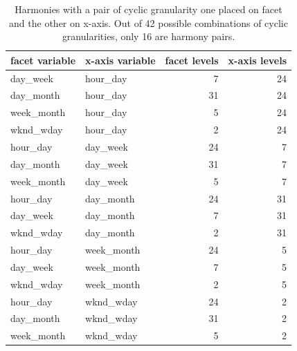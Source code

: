 \documentclass[12pt]{article}
\begin{document}
\begin{table}

\caption{\label{tab:harmony-tab}Harmonies with a pair of cyclic granularity one placed on facet and the other on x-axis. Out of 42 possible combinations of cyclic granularities, only 16 are harmony pairs.}
\centering
\begin{tabular}[t]{llrr}
\toprule
facet variable & x-axis variable & facet levels & x-axis levels\\
\midrule
day\_week & hour\_day & 7 & 24\\
day\_month & hour\_day & 31 & 24\\
week\_month & hour\_day & 5 & 24\\
wknd\_wday & hour\_day & 2 & 24\\
hour\_day & day\_week & 24 & 7\\
\addlinespace
day\_month & day\_week & 31 & 7\\
week\_month & day\_week & 5 & 7\\
hour\_day & day\_month & 24 & 31\\
day\_week & day\_month & 7 & 31\\
wknd\_wday & day\_month & 2 & 31\\
\addlinespace
hour\_day & week\_month & 24 & 5\\
day\_week & week\_month & 7 & 5\\
wknd\_wday & week\_month & 2 & 5\\
hour\_day & wknd\_wday & 24 & 2\\
day\_month & wknd\_wday & 31 & 2\\
\addlinespace
week\_month & wknd\_wday & 5 & 2\\
\bottomrule
\end{tabular}
\end{table}
\end{document}
